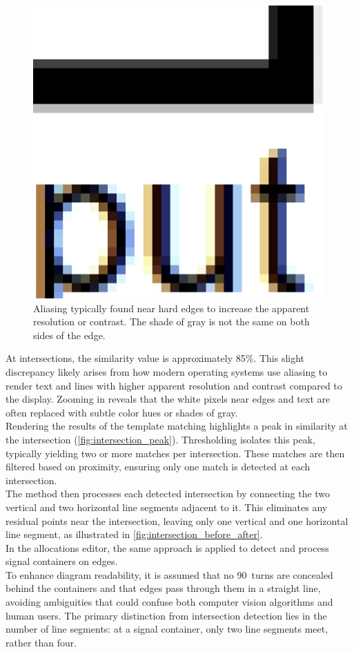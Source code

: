 \begin{figure}
    \centering
    \includegraphics[width=\linewidth]{pictures/aliasing.png}
    \caption{Aliasing typically found near hard edges to increase the apparent resolution or contrast. The shade of gray is not the same on both sides of the edge.}
    \label{fig:aliasing}
\end{figure}
At intersections, the similarity value is approximately 85$\%$. This slight discrepancy likely arises from how modern operating systems use aliasing to render text and lines with higher apparent resolution and contrast compared to the display. Zooming in reveals that the white pixels near edges and text are often replaced with subtle color hues or shades of gray.\\
Rendering the results of the template matching highlights a peak in similarity at the intersection (\autoref{fig:intersection_peak}). Thresholding isolates this peak, typically yielding two or more matches per intersection. These matches are then filtered based on proximity, ensuring only one match is detected at each intersection.\\
The method then processes each detected intersection by connecting the two vertical and two horizontal line segments adjacent to it. This eliminates any residual points near the intersection, leaving only one vertical and one horizontal line segment, as illustrated in \autoref{fig:intersection_before_after}.\\
In the allocations editor, the same approach is applied to detect and process signal containers on edges.\\
To enhance diagram readability, it is assumed that no 90\textdegree\ turns are concealed behind the containers and that edges pass through them in a straight line, avoiding ambiguities that could confuse both computer vision algorithms and human users. The primary distinction from intersection detection lies in the number of line segments: at a signal container, only two line segments meet, rather than four.

